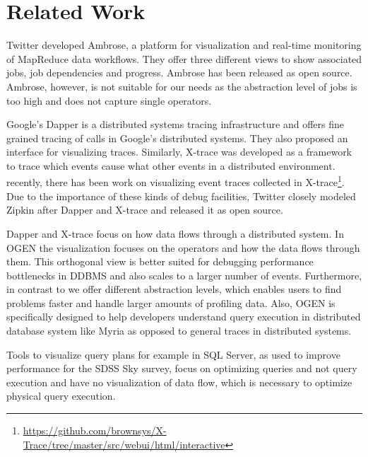 \documentclass{chi2009}
\newcommand*{\system}{OGEN\xspace}
\begin{document}


\section{Related Work}

Twitter developed Ambrose\cite{ambrose}, a platform for visualization and real-time monitoring of MapReduce data workflows. They offer three different views to show associated jobs, job dependencies and progress. Ambrose has been released as open source. Ambrose, however, is not suitable for our needs as the abstraction level of jobs is too high and does not capture single operators.

Google's Dapper\cite{sigelman2010dapper} is a distributed systems tracing infrastructure and offers fine grained tracing of calls in Google's distributed systems. They also proposed an interface for visualizing traces. Similarly, X-trace\cite{fonseca2007x} was developed as a framework to trace which events cause what other events in a distributed environment. recently, there has been work on visualizing event traces collected in X-trace\footnote{\url{https://github.com/brownsys/X-Trace/tree/master/src/webui/html/interactive}}. Due to the importance of these kinds of debug facilities, Twitter closely modeled Zipkin\cite{zipkin} after Dapper and X-trace and released it as open source.

Dapper and X-trace focus on how data flows through a distributed system. In \system the visualization focuses on the operators and how the data flows through them. This orthogonal view is better suited for debugging performance bottlenecks in DDBMS and also scales to a larger number of events. Furthermore, in contrast to  we offer different abstraction levels, which enables users to find problems faster and handle larger amounts of profiling data. Also, \system is specifically designed to help developers understand query execution in distributed database system like Myria as opposed to general traces in distributed systems.

Tools to visualize query plans for example in SQL Server, as used to improve performance for the SDSS Sky survey\cite{szalay2002sdss}, focus on optimizing queries and not query execution and have no visualization of data flow, which is necessary to optimize physical query execution.
\end{document}
